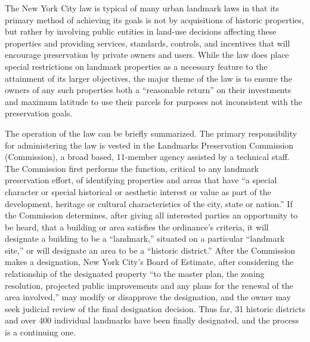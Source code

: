 The New York City law is typical of many urban landmark laws in that its primary
method of achieving its goals is not by acquisitions of historic
properties, but rather by involving public entities in land-use
decisions affecting these properties and providing services, standards,
controls, and incentives that will encourage preservation by private owners and
users. While the law does place special restrictions on landmark properties as a
necessary feature to the attainment of its larger objectives, the major theme of
the law is to ensure the owners of any such properties both a ``reasonable
return'' on their investments and maximum latitude to use their parcels for
purposes not inconsistent with the preservation goals.

The operation of the law can be briefly summarized. The primary responsibility
for administering the law is vested in the Landmarks Preservation Commission
(Commission), a broad based, 11-member agency assisted by a technical staff. The
Commission first performs the function, critical to any landmark preservation
effort, of identifying properties and areas that have ``a special character or
special historical or aesthetic interest or value as part of the development,
heritage or cultural characteristics of the city, state or nation.'' If the
Commission determines, after giving all interested parties an opportunity to be
heard, that a building or area satisfies the ordinance's criteria, it will
designate a building to be a ``landmark,'' situated on a particular ``landmark
site,'' or will designate an area to be a ``historic district.'' After the
Commission makes a designation, New York City's Board of Estimate, after
considering the relationship of the designated property ``to the master plan,
the zoning resolution, projected public improvements and any plans for the
renewal of the area involved,'' may modify or disapprove the designation, and
the owner may seek judicial review of the final designation decision. Thus far,
31 historic districts and over 400 individual landmarks have been finally
designated, and the process is a continuing one.

